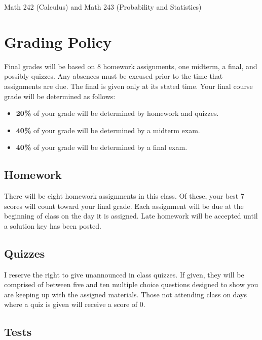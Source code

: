 \documentclass[11pt,]{article}
\begin{document}
Math 242 (Calculus) and Math 243 (Probability and Statistics)

\hypertarget{grading-policy}{%
\section{Grading Policy}\label{grading-policy}}

Final grades will be based on 8 homework assignments, one midterm, a
final, and possibly quizzes. Any absences must be excused prior to the
time that assignments are due. The final is given only at its stated
time. Your final course grade will be determined as follows:

\begin{itemize}
\item
  \textbf{20\%} of your grade will be determined by homework and
  quizzes.
\item
  \textbf{40\%} of your grade will be determined by a midterm exam.
\item
  \textbf{40\%} of your grade will be determined by a final exam.
\end{itemize}

\hypertarget{homework}{%
\subsection{Homework}\label{homework}}

There will be eight homework assignments in this class. Of these, your
best 7 scores will count toward your final grade. Each assignment will
be due at the beginning of class on the day it is assigned. Late
homework will be accepted until a solution key has been posted.

\hypertarget{quizzes}{%
\subsection{Quizzes}\label{quizzes}}

I reserve the right to give unannounced in class quizzes. If given, they
will be comprised of between five and ten multiple choice questions
designed to show you are keeping up with the assigned materials. Those
not attending class on days where a quiz is given will receive a score
of 0.

\hypertarget{tests}{%
\subsection{Tests}\label{tests}}
\end{document}
